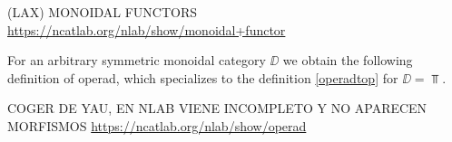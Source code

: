 \documentclass[TFM.tex]{subfiles}
\begin{document}
(LAX) MONOIDAL FUNCTORS \url{https://ncatlab.org/nlab/show/monoidal+functor}

For an arbitrary symmetric monoidal category $\DD$ we obtain the following definition of operad, which specializes to the definition \ref{operadtop} for $\DD=\Top$.

\begin{defi}
COGER DE YAU, EN NLAB VIENE INCOMPLETO Y NO APARECEN MORFISMOS \url{https://ncatlab.org/nlab/show/operad}
\end{defi}
\end{document}
